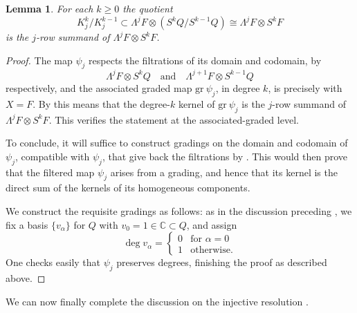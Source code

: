 \documentclass[11pt]{article}
\theoremstyle{plain}
\newtheorem{lemma}{Lemma}[section]
\theoremstyle{nonumberplain}
\theoremstyle{plain}
\numberwithin{equation}{section}
\theoremstyle{nonumberplain}
\newtheorem{proof}{Proof}
\newcommand\bC{{\mathbb C}}
\newcommand\1{{\bf 1}}
\begin{document}
\begin{lemma}\label{le:ksubq}
  For each $k\ge 0$ the quotient
  \begin{equation}\label{eq:kfq}
    K_j^k/K_j^{k-1}\subset \Lambda^j F\otimes \left(S^kQ/S^{k-1}Q\right)\cong \Lambda^j F\otimes S^k F
  \end{equation}
  is the $j$-row summand of $\Lambda^{j} F\otimes S^{k}F$. 
\end{lemma}
\begin{proof}
  The map $\psi_j$ respects the filtrations of its domain and codomain, by
  \begin{equation}\label{eq:filtrations}
    \Lambda^j F\otimes S^k Q\quad\text{and}\quad \Lambda^{j+1} F\otimes S^{k-1} Q
  \end{equation}
  respectively, and the associated graded map $\mathrm{gr}~\psi_j$, in degree $k$, is precisely  with $X=F$. By  this means that the degree-$k$ kernel of $\mathrm{gr}~\psi_j$ is the $j$-row summand of $\Lambda^j F\otimes S^k F$. This verifies the statement at the associated-graded level.

  To conclude, it will suffice to construct gradings on the domain and codomain of $\psi_j$, compatible with $\psi_j$, that give back the filtrations by . This would then prove that the filtered map $\psi_j$ arises from a grading, and hence that its kernel is the direct sum of the kernels of its homogeneous components. 

  We construct the requisite gradings as follows: as in the discussion preceding , we fix a basis $\{v_{\alpha}\}$ for $Q$ with $v_0=1\in \bC\subset Q$, and assign
  \begin{equation*}
    \deg v_{\alpha}=
    \begin{cases}
      0&\text{for }\alpha=0\\
      1&\text{otherwise}.
    \end{cases}
  \end{equation*}
  One checks easily that $\psi_j$ preserves degrees, finishing the proof as described above.
\end{proof}

We can now finally complete the discussion on the injective resolution .
\end{document}
